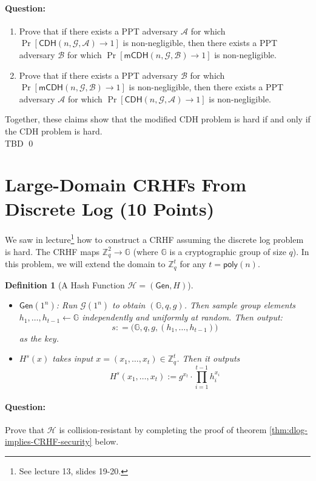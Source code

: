\documentclass[11pt]{article}
\newtheorem{definition}[theorem]{Definition}
\numberwithin{equation}{section}
\newcommand{\Gen}{\mathsf{Gen}}
\newcommand{\gen}{\mathsf{Gen}}
\newcommand{\A}{\mathcal{A}}
\newcommand{\B}{\mathcal{B}}
\newcommand{\G}{\mathcal{G}}
\renewcommand{\H}{\mathcal{H}}
\newcommand{\GG}{\mathbb{G}}
\newcommand{\ZZ}{\mathbb{Z}}
\newenvironment{solution}{\color{blue}\noindent{\bf Solution}\hspace*{1em}}{\qed\medskip}
\begin{document}
\paragraph{Question:} 
\begin{enumerate}
    \item Prove that if there exists a PPT adversary $\A$ for which $\Pr[\mathsf{CDH}(n, \G, \A) \to 1]$ is non-negligible, then there exists a PPT adversary $\B$ for which $\Pr[\mathsf{mCDH}(n, \G, \B) \to 1]$ is non-negligible.
    \item Prove that if there exists a PPT adversary $\B$ for which $\Pr[\mathsf{mCDH}(n, \G, \B) \to 1]$ is non-negligible, then there exists a PPT adversary $\A$ for which $\Pr[\mathsf{CDH}(n, \G, \A) \to 1]$ is non-negligible.
\end{enumerate}
Together, these claims show that the modified CDH problem is hard if and only if the CDH problem is hard.\\

\begin{solution}
TBD
\end{solution}
\pagebreak

\section{Large-Domain CRHFs From Discrete Log (10 Points)}

We saw in lecture\footnote{See lecture 13, slides 19-20.} how to construct a CRHF assuming the discrete log problem is hard. The CRHF maps $\ZZ_q^2 \to \GG$ (where $\GG$ is a cryptographic group of size $q$). In this problem, we will extend the domain to $\ZZ_q^t$ for any $t = \mathsf{poly}(n)$.

\begin{definition}[A Hash Function $\H = (\Gen, H)$]
$ $
\begin{itemize}
    \item $\gen(1^n)$: Run $\G(1^n)$ to obtain $(\GG, q, g)$. Then sample group elements $h_1,\dots, h_{t-1} \gets \GG$ independently and uniformly at random. Then output: 
    \[s : = \big( \GG, q, g, (h_1,\dots, h_{t-1}) \big)\] 
    as the key.
    \item $H^s(x)$ takes input $x = (x_1, \dots, x_t) \in \ZZ_q^{t}$. Then it outputs 
    \[H^s(x_1,\dots, x_t) := g^{x_t} \cdot \prod_{i=1}^{t-1} h_i^{x_i}\]
\end{itemize}
\end{definition}

\paragraph{Question:} Prove that $\mathcal{H}$ is collision-resistant by completing the proof of theorem \ref{thm:dlog-implies-CRHF-security} below.
\end{document}
